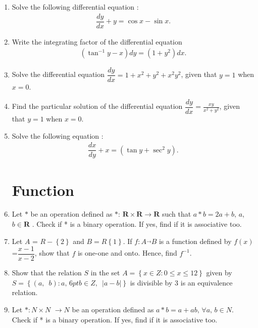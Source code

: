 \documentclass[12pt,-letter paper]{article}
\providecommand{\cbrak}[1]{\ensuremath{\left\{#1\right\}}}
\providecommand{\brak}[1]{\ensuremath{\left(#1\right)}}
\providecommand{\abs}[1]{\left\vert#1\right\vert}
\begin{document}
\begin{enumerate}
    \item Solve the following differential equation :
     \begin{align*}
         \dfrac{dy}{dx}+y=\cos{x} - \sin{x}.
     \end{align*}

    \item Write the integrating factor of the differential equation
    \begin{align*}
    \brak{\tan^{-1}{y-x}}dy=\brak{1+y^{2}}dx.
    \end{align*}

    \item Solve the differential equation $\dfrac{dy}{dx}=1+x^{2}+y^{2}+x^{2}y^{2}$, given that $ y = 1 $ when $x = 0$.

    \item Find the particular solution of the differential equation $\dfrac{dy}{dx}=\frac{xy}{x^2+y^2}$, given that $y=1$ when $x=0$.

    \item Solve the following  equation :
     \begin{align*}
         \dfrac{dx}{dy}+x=\brak{\tan{y}+\sec^{2}{y}}.
     \end{align*}
        
\section{Function}
    \item Let $*$ be an operation defined as $*$: $\textbf{R}\times\textbf{R}\rightarrow \textbf{R} $ such that $a * b = 2a + b,\,a$, $b\in \textbf{R} $ . Check if * is a binary operation. If yes, find if it is associative too.

    \item Let $A$ = $R-\cbrak{2}$ and $B=R\cbrak{1}$. If $f: A\overrightarrow{}  B$ is a function defined by $f\brak{x}$=$\dfrac{x-1}{x-2}$, show that $f$ is one-one and onto. Hence, find $f^{-1}$.

    \item Show that the relation $S$ in the set $A = \cbrak{x \in Z : 0 \leq x \leq 12}$ given by $S = \cbrak{(a,\hspace{6pt}b) : a,\,{6pt}b \in Z,\hspace{6pt}\abs{a-b}}$ is divisible by $3$ is an equivalence relation.

    \item Let $* : N \times N$ $\rightarrow N $ be an operation defined as $a * b = a + ab, \,\forall a,\,b \in N $. Check if * is a binary operation. If yes, find if it is associative too.



\end{enumerate}
\end{document}

